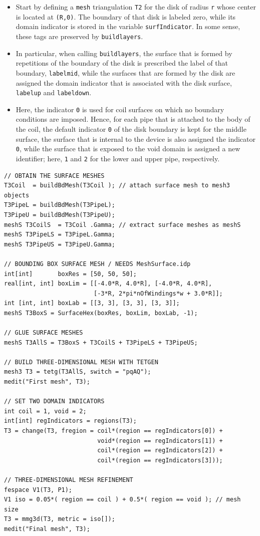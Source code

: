 \documentclass[9pt]{amsart}
\theoremstyle{remark}
\theoremstyle{definition}
\begin{document}
\begin{itemize}
\item Start by defining a \verb!mesh! triangulation \verb!T2! for the disk of radius \verb!r! whose center is located at \verb!(R,0)!. The boundary of that disk is labeled zero, while its domain indicator is stored in the variable \verb!surfIndicator!. In some sense, these tags are preserved by \verb!buildlayers!.
\item In particular, when calling \verb!buildlayers!, the surface that is formed by repetitions of the boundary of the disk is prescribed the label of that boundary, \verb!labelmid!, while the surfaces that are formed by the disk are assigned the domain indicator that is associated with the disk surface, \verb!labelup! and \verb!labeldown!.
\item Here, the indicator \verb!0! is used for coil surfaces on which no boundary conditions are imposed. Hence, for each pipe that is attached to the body of the coil, the default indicator \verb!0! of the disk boundary is kept for the middle surface, the surface that is internal to the device is also assigned the indicator \verb!0!, while the surface that is exposed to the void domain is assigned a new identifier; here, \verb!1! and \verb!2! for the lower and upper pipe, respectively.
\end{itemize}

\begin{Verbatim}[commandchars=\\\{\}]
// OBTAIN THE SURFACE MESHES
T3Coil  = buildBdMesh(T3Coil ); // attach surface mesh to mesh3 objects
T3PipeL = buildBdMesh(T3PipeL);
T3PipeU = buildBdMesh(T3PipeU);
meshS T3CoilS  = T3Coil .Gamma; // extract surface meshes as meshS
meshS T3PipeLS = T3PipeL.Gamma;
meshS T3PipeUS = T3PipeU.Gamma;

// BOUNDING BOX SURFACE MESH / NEEDS MeshSurface.idp
int[int]       boxRes = [50, 50, 50];
real[int, int] boxLim = [[-4.0*R, 4.0*R], [-4.0*R, 4.0*R],
                         [-3*R, 2*pi*nOfWindings*w + 3.0*R]];
int [int, int] boxLab = [[3, 3], [3, 3], [3, 3]];
meshS T3BoxS = SurfaceHex(boxRes, boxLim, boxLab, -1);

// GLUE SURFACE MESHES
meshS T3AllS = T3BoxS + T3CoilS + T3PipeLS + T3PipeUS;

// BUILD THREE-DIMENSIONAL MESH WITH TETGEN
mesh3 T3 = tetg(T3AllS, switch = "pqAQ");
medit("First mesh", T3);

// SET TWO DOMAIN INDICATORS
int coil = 1, void = 2;
int[int] regIndicators = regions(T3);
T3 = change(T3, fregion = coil*(region == regIndicators[0]) +
                          void*(region == regIndicators[1]) +
                          coil*(region == regIndicators[2]) +
                          coil*(region == regIndicators[3]));

// THREE-DIMENSIONAL MESH REFINEMENT
fespace V1(T3, P1);
V1 iso = 0.05*( region == coil ) + 0.5*( region == void ); // mesh size
T3 = mmg3d(T3, metric = iso[]);
medit("Final mesh", T3);
\end{Verbatim}
\end{document}
